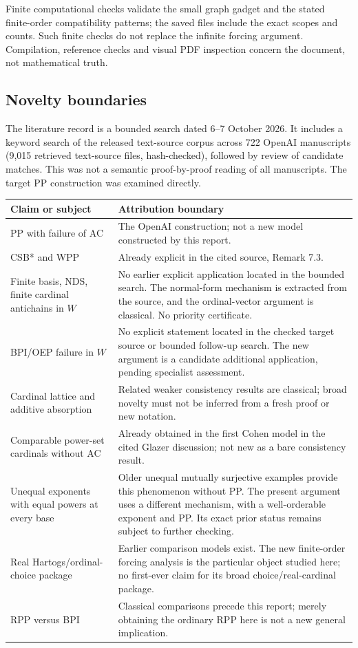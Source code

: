 Finite computational checks validate the small graph gadget and the stated finite-order compatibility patterns; the saved files include the exact scopes and counts. Such finite checks do not replace the infinite forcing argument. Compilation, reference checks and visual PDF inspection concern the document, not mathematical truth.

\subsection{Novelty boundaries}
The literature record is a bounded search dated 6--7 October 2026. It includes a keyword search of the released text-source corpus across 722 OpenAI manuscripts (9,015 retrieved text-source files, hash-checked), followed by review of candidate matches. This was not a semantic proof-by-proof reading of all manuscripts. The target PP construction was examined directly.
\begin{longtable}{>{\raggedright\arraybackslash}p{.30\linewidth}>{\raggedright\arraybackslash}p{.62\linewidth}}
\toprule
Claim or subject & Attribution boundary\\\midrule\endhead
PP with failure of AC & The OpenAI construction; not a new model constructed by this report.\\
CSB* and WPP & Already explicit in the cited source, Remark 7.3.\\
Finite basis, NDS, finite cardinal antichains in $W$ & No earlier explicit application located in the bounded search. The normal-form mechanism is extracted from the source, and the ordinal-vector argument is classical. No priority certificate.\\
BPI/OEP failure in $W$ & No explicit statement located in the checked target source or bounded follow-up search. The new argument is a candidate additional application, pending specialist assessment.\\
Cardinal lattice and additive absorption & Related weaker consistency results are classical; broad novelty must not be inferred from a fresh proof or new notation.\\
Comparable power-set cardinals without AC & Already obtained in the first Cohen model in the cited Glazer discussion; not new as a bare consistency result.\\
Unequal exponents with equal powers at every base & Older unequal mutually surjective examples provide this phenomenon without PP. The present argument uses a different mechanism, with a well-orderable exponent and PP. Its exact prior status remains subject to further checking.\\
Real Hartogs/ordinal-choice package & Earlier comparison models exist. The new finite-order forcing analysis is the particular object studied here; no first-ever claim for its broad choice/real-cardinal package.\\
RPP versus BPI & Classical comparisons precede this report; merely obtaining the ordinary RPP here is not a new general implication.\\
\bottomrule
\end{longtable}

